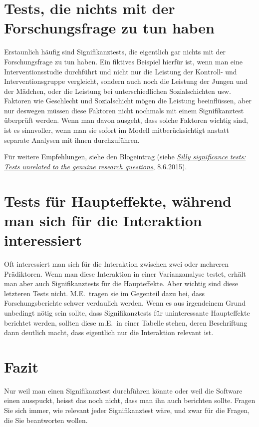 \documentclass[oneside, 10pt]{book}\usepackage[]{graphicx}\usepackage[]{xcolor}
\begin{document}
\section{Tests, die nichts mit der Forschungsfrage zu tun haben}
Erstaunlich häufig sind Signifikanztests, die eigentlich
gar nichts mit der Forschungsfrage zu tun haben. Ein fiktives
Beispiel hierfür ist, 
wenn man eine Interventionsstudie durchführt und nicht nur
die Leistung der Kontroll- und Interventionsgruppe vergleicht,
sondern auch noch die Leistung der Jungen und der Mädchen,
oder die Leistung bei unterschiedlichen Sozialschichten usw.
Faktoren wie Geschlecht und Sozialschicht mögen die Leistung
beeinflüssen, aber nur deswegen müssen diese Faktoren nicht
nochmals mit einem Signifikanztest überprüft werden. 
Wenn man davon ausgeht, dass solche Faktoren wichtig sind,
ist es sinnvoller, wenn man sie sofort im Modell mitberücksichtigt
anstatt separate Analysen mit ihnen durchzuführen.

Für weitere Empfehlungen, siehe den Blogeintrag
(siehe \href{https://janhove.github.io/analysis/2015/06/08/unrelated-tests}{\textit{Silly significance tests: Tests unrelated to the genuine research questions}}, 8.6.2015).

\section{Tests für Haupteffekte, während man sich für die Interaktion interessiert}
Oft interessiert man sich für die Interaktion zwischen
zwei oder mehreren Prädiktoren. Wenn man diese Interaktion in einer
Varianzanalyse testet, erhält man aber auch Signifikanztests
für die Haupteffekte. Aber wichtig sind diese letzteren Tests
nicht. M.E.\ tragen sie im Gegenteil dazu bei, 
dass Forschungsberichte schwer verdaulich werden.
Wenn es aus irgendeinem Grund unbedingt nötig sein sollte,
dass Signifikanztests für uninteressante Haupteffekte 
berichtet werden, sollten diese m.E.\ in einer Tabelle
stehen, deren Beschriftung dann deutlich macht, dass
eigentlich nur die Interaktion relevant ist.

\section{Fazit}
Nur weil man einen Signifikanztest durchführen könnte
oder weil die Software einen ausspuckt, heisst das noch
nicht, dass man ihn auch berichten sollte. Fragen Sie sich
immer, wie relevant jeder Signifikanztest wäre, und zwar für
die Fragen, die Sie beantworten wollen.
\end{document}
